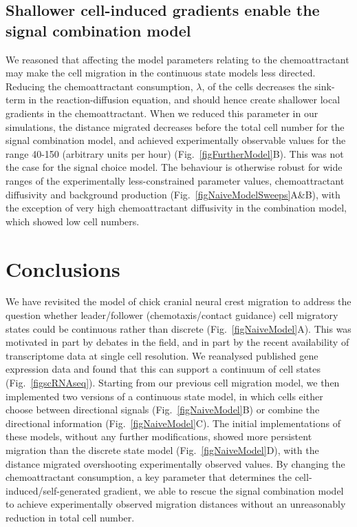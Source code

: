 \documentclass[review]{elsarticle}
\begin{document}
\subsection{Shallower cell-induced gradients enable the signal combination model}
We reasoned that affecting the model parameters relating to the chemoattractant may make the cell migration in the continuous state models less directed. Reducing the chemoattractant consumption, $\lambda$, of the cells decreases the sink-term in the reaction-diffusion equation, and should hence create shallower local gradients in the chemoattractant. When we reduced this parameter in our simulations, the distance migrated decreases before the total cell number for the signal combination model, and achieved experimentally observable values for the range 40-150 (arbitrary units per hour) (Fig.~\ref{figFurtherModel}B). This was not the case for the signal choice model. The behaviour is otherwise robust for wide ranges of the experimentally less-constrained parameter values, chemoattractant diffusivity and background production (Fig.~\ref{figNaiveModelSweeps}A\&B), with the exception of very high chemoattractant diffusivity in the combination model, which showed low cell numbers. 

\section{Conclusions}
We have revisited the model of chick cranial neural crest migration to address the question whether leader/follower (chemotaxis/contact guidance) cell migratory states could be continuous rather than discrete (Fig.~\ref{figNaiveModel}A). This was motivated in part by debates in the field, and in part by the recent availability of transcriptome data at single cell resolution. We reanalysed published gene expression data and found that this can support a continuum of cell states (Fig.~\ref{figscRNAseq}). Starting from our previous cell migration model, we then implemented two versions of a continuous state model, in which cells either choose between directional signals (Fig.~\ref{figNaiveModel}B) or combine the directional information (Fig.~\ref{figNaiveModel}C). The initial implementations of these models, without any further modifications, showed more persistent migration than the discrete state model (Fig.~\ref{figNaiveModel}D), with the distance migrated overshooting experimentally observed values. By changing the chemoattractant consumption, a key parameter that determines the cell-induced/self-generated gradient, we able to rescue the signal combination model to achieve experimentally observed migration distances without an unreasonably reduction in total cell number.
\end{document}
